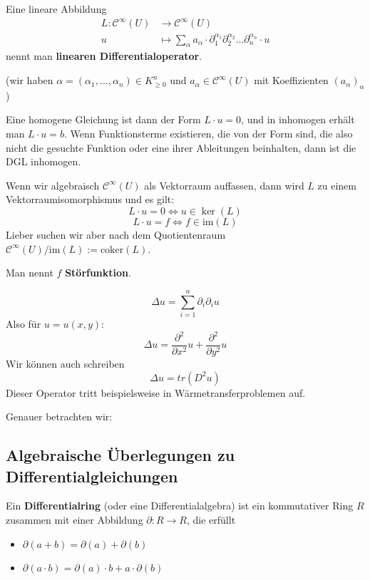 \documentclass[main.tex]{subfiles}
\begin{document}
\begin{Definition}
  Eine lineare Abbildung
  $$\begin{aligned}
    L : \mathcal{C}^\infty(U) & \to \mathcal{C}^\infty(U) \\
    u & \mapsto \sum \limits_\alpha a_\alpha \cdot \partial_1^{\alpha_1} \partial_2^{\alpha_2} ... \partial_n^{\alpha_n} \cdot u
  \end{aligned}$$
  nennt man \textbf{linearen Differentialoperator}.

  (wir haben $\alpha = (\alpha_1,...,\alpha_n) \in K_{\geq 0}^n$ und $a_\alpha \in \mathcal{C}^\infty(U)$ mit Koeffizienten $(a_\alpha)_\alpha$)

  Eine homogene Gleichung ist dann der Form $L \cdot u = 0$, und in inhomogen erhält man $L \cdot u = b$.
  Wenn Funktionsterme existieren, die von der Form sind, die also nicht die gesuchte Funktion oder eine ihrer Ableitungen beinhalten, dann ist die DGL inhomogen.
  \begin{Bemerkung}
    Wenn wir algebraisch $\mathcal{C}^\infty(U)$ als Vektorraum auffassen, dann wird $L$ zu einem Vektorraumisomorphismus und es gilt:
    $$L \cdot u = 0 \Leftrightarrow u \in \ker(L)$$
    $$L \cdot u = f \Leftrightarrow f \in \text{im}(L)$$
    Lieber suchen wir aber nach dem Quotientenraum $\mathcal{C}^\infty(U) / \text{im}(L) := \text{coker}(L)$.
  \end{Bemerkung}

  Man nennt $f$ \textbf{Störfunktion}.
\end{Definition}

\begin{Beispiel}
  $$\Delta u = \sum \limits_{i = 1}^n \partial_i \partial_i u$$
  Also für $u = u(x,y)$:
  $$\Delta u = \dfrac{\partial^2}{\partial x^2}u + \dfrac{\partial^2}{\partial y^2} u$$
  Wir können auch schreiben
  $$\Delta u = tr(D^2 u)$$
  Dieser Operator tritt beispielsweise in Wärmetransferproblemen auf.
\end{Beispiel}

Genauer betrachten wir:

\subsection{Algebraische Überlegungen zu Differentialgleichungen}

\begin{Definition}[Differentialring]
  Ein \textbf{Differentialring} (oder eine Differentialalgebra) ist ein kommutativer Ring $R$ zusammen mit einer Abbildung $\partial: R \to R$, die erfüllt
  \begin{itemize}
    \item $\partial(a+b) = \partial(a) + \partial(b)$
    \item $\partial(a \cdot b) = \partial(a) \cdot b + a \cdot \partial(b)$
  \end{itemize}
\end{Definition}
\end{document}
